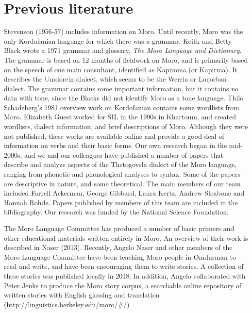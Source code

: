 \section{Previous literature}
Stevenson (1956-57) includes information on Moro. 
Until recently, Moro was the only Kordofanian language for which there was a grammar. Keith and Betty Black wrote a 1971 grammar and glossary, \textit{The Moro Language and Dictionary}. The grammar is based on 12 months of fieldwork on Moro, and is primarily based on the speech of one main consultant, identified as Kapiroma (or Kapirma). It describes the Umdorein dialect, which seems to be the Werria or Loŋorban dialect. The grammar contains some important information, but it contains no data with tone, since the Blacks did not identify Moro as a tone language. 
Thilo Schadeberg's 1981 overview work on Kordofanian contains some wordlists from Moro.
Elizabeth Guest worked for SIL in the 1990s in Khartoum, and created wordlists, dialect information, and brief descriptions of Moro. Although they were not published, these works are available online and provide a good deal of information on verbs and their basic forms. 
Our own research began in the mid-2000s, and we and our colleagues have published a number of papers that describe and analyze aspects of the Thetogovela dialect of the Moro language, ranging from phonetic and phonological analyses to syntax. Some of the papers are descriptive in nature, and some theoretical. The main members of our team included Farrell Ackerman, George Gibbard, Laura Kertz, Andrew Strabone and Hannah Rohde. Papers published by members of this team are included in the bibliography. Our research was funded by the National Science Foundation. 

The Moro Language Committee has produced a number of basic primers and other educational materials written entirely in Moro. An overview of their work is described in Naser (2013). Recently, Angelo Naser and other members of the Moro Language Committee have been teaching Moro people in Omdurman to read and write, and have been encouraging them to write stories. A collection of these stories was published locally in 2018. In addition, Angelo collaborated with Peter Jenks to produce the Moro story corpus, a searchable online repository of written stories with English glossing and translation (http://linguistics.berkeley.edu/moro/\#/)

